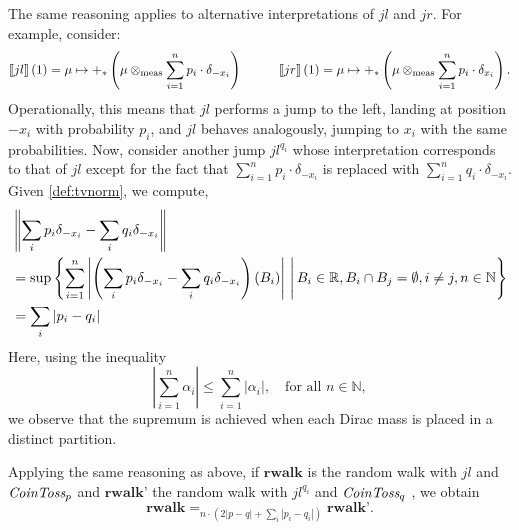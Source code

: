 \begin{example}
  
The same reasoning applies to alternative interpretations of $jl$ and $jr$. For example, consider:
\[
                        \left \llbracket jl \right \rrbracket(1)= \mu \mapsto +_\ast \left(\mu \otimes_{\text{meas}} \sum_{i=1}^n  p_i\cdot  \delta_{-x_i}\right)
                        \hspace{1cm}
                        \left \llbracket jr \right \rrbracket(1) =\mu \mapsto +_\ast \left(\mu \otimes_{\text{meas}} \sum_{i=1}^n p_i\cdot \delta_{x_i}\right).
        \]
Operationally, this means that $jl$ performs a jump to the left, landing at position $-x_i$ with probability $p_i$, and $jl$ behaves analogously, jumping to $x_i$ with the same probabilities. Now, consider another jump $jl^{q_i}$ whose interpretation corresponds to that of $jl$ except for the fact that $\sum_{i=1}^n p_i\cdot \delta_{-x_i}$ is replaced with $ \sum_{i=1}^n  q_i\cdot \delta_{-x_i}$.
Given \autoref{def:tvnorm}, we compute,
    \begin{align*}
      &\left\lVert  \sum_i p_i \delta_{-x_i} - \sum_i q_i \delta_{-x_i} \right\rVert  \\
      & = \sup \left\{ \sum_{i=1}^{n} \left\lvert \left(\sum_i p_i \delta_{-x_i} - \sum_i q_i \delta_{-x_i} \right) (B_i) \right\rvert \,\Bigg| \, B_i \in \mathbb{R}, B_i \cap B_j = \emptyset,  i \neq j, n \in \mathbb{N}  \right\} \\
      & = \sum_i |p_i-q_i|
    \end{align*}
    Here, using the inequality
\[
\left| \sum_{i=1}^{n} \alpha_i \right| \leq \sum_{i=1}^{n} |\alpha_i|, \quad \text{for all } n \in \mathbb{N},
\]
we observe that the supremum is achieved when each Dirac mass is placed in a distinct partition.

Applying the same reasoning as above, if $\textbf{rwalk}$ is the random walk with  $jl$ and $ \emph{CoinToss}_p$  and $\textbf{rwalk'}$ the random walk with $jl^{q_i}$ and $ \emph{CoinToss}_q$ , we obtain 
 \[
                \textbf{rwalk} =_{n \cdot \left(2 |p-q|+ \sum_i |p_i-q_i|\right)}
                \textbf{rwalk'}. 
        \]


        
\end{example}